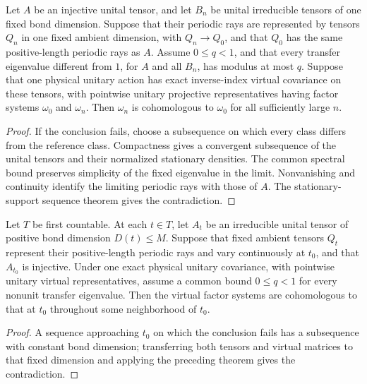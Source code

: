 \begin{lemma}
    \label{thm:spc_aux_compact_minimal_sequence_class}
    \leanok
    Let $A$ be an injective unital tensor, and let $B_n$ be unital irreducible
    tensors of one fixed bond dimension. Suppose that their periodic rays are
    represented by tensors $Q_n$ in one fixed ambient dimension, with
    $Q_n\to Q_0$, and that $Q_0$ has the same positive-length periodic rays as
    $A$. Assume $0\le q<1$, and that every transfer eigenvalue different from
    $1$, for $A$ and all $B_n$, has modulus at most $q$. Suppose that one
    physical unitary action has exact inverse-index virtual covariance on
    these tensors, with pointwise unitary projective representatives having
    factor systems $\omega_0$ and $\omega_n$. Then $\omega_n$ is cohomologous
    to $\omega_0$ for all sufficiently large $n$.
\end{lemma}
\begin{proof}\leanok
    If the conclusion fails, choose a subsequence on which every class differs
    from the reference class. Compactness gives a convergent subsequence of
    the unital tensors and their normalized stationary densities. The common
    spectral bound preserves simplicity of the fixed eigenvalue in the limit.
    Nonvanishing and continuity identify the limiting periodic rays with those
    of $A$. The stationary-support sequence theorem gives the contradiction.
\end{proof}

\begin{lemma}
    \label{thm:spc_aux_bounded_minimal_local_class}
    \leanok
    Let $T$ be first countable. At each $t\in T$, let $A_t$ be an irreducible
    unital tensor of positive bond dimension $D(t)\le M$. Suppose that fixed
    ambient tensors $Q_t$ represent their positive-length periodic rays and
    vary continuously at $t_0$, and that $A_{t_0}$ is injective. Under one
    exact physical unitary covariance, with pointwise unitary virtual
    representatives, assume a common bound $0\le q<1$ for every nonunit
    transfer eigenvalue. Then the virtual factor systems are cohomologous to
    that at $t_0$ throughout some neighborhood of $t_0$.
\end{lemma}
\begin{proof}\leanok
    A sequence approaching $t_0$ on which the conclusion fails has a
    subsequence with constant bond dimension; transferring both tensors and
    virtual matrices to that fixed dimension and applying the preceding
    theorem gives the contradiction.
\end{proof}

